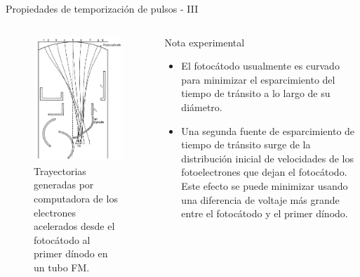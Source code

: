 \documentclass[a4paper,10pt]{beamer}
\begin{document}
\begin{frame}{Propiedades de temporización de pulsos - III}
 
 \begin{columns}[c]
  \column{2in}
  
  \begin{figure}
  \includegraphics[scale=0.4]{fig23}
   \caption{Trayectorias generadas por computadora de los electrones 
   acelerados desde el fotocátodo al primer dínodo en un tubo FM.}
  \end{figure}
  
  \column{2.5in}
  \begin{exampleblock}{Nota experimental}
   \begin{itemize} [<+->]
    \item \begin{justify}
	  El fotocátodo usualmente es curvado para minimizar el esparcimiento 
	  del tiempo de tránsito a lo largo de su diámetro.
          \end{justify}
    \item \begin{justify}
          Una segunda fuente de esparcimiento de tiempo de tránsito surge de 
          la distribución inicial de velocidades de los fotoelectrones que 
          dejan el fotocátodo. Este efecto se puede minimizar usando una diferencia
          de voltaje más grande entre el fotocátodo y el primer dínodo.
          \end{justify}
   \end{itemize} 
  \end{exampleblock}  
 \end{columns}

\end{frame}
\end{document}
